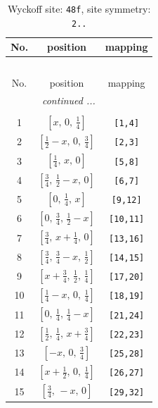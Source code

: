 \documentclass[fleqn,8pt]{jsarticle}
\begin{document}
\renewcommand{\arraystretch}{1.2}
\begin{longtable}{ccc}
\caption{Wyckoff site: {\tt 48f}, site symmetry: {\tt 2..}}
 \\
 \hline \hline
No. & position & mapping \\ \hline \endfirsthead

\multicolumn{2}{l}{\tablename\ \thetable{}} \\
 \hline \hline
No. & position & mapping \\ \hline \endhead

 \hline \hline
\multicolumn{2}{r}{\footnotesize\it continued ...} \\ \endfoot

 \hline \hline
\multicolumn{2}{r}{} \\ \endlastfoot

1 & $\left[ x,\, 0,\, \frac{1}{4} \right]$ & {\tt [1,4]} \\ \hline
2 & $\left[ \frac{1}{2} - x,\, 0,\, \frac{3}{4} \right]$ & {\tt [2,3]} \\ \hline
3 & $\left[ \frac{1}{4},\, x,\, 0 \right]$ & {\tt [5,8]} \\ \hline
4 & $\left[ \frac{3}{4},\, \frac{1}{2} - x,\, 0 \right]$ & {\tt [6,7]} \\ \hline
5 & $\left[ 0,\, \frac{1}{4},\, x \right]$ & {\tt [9,12]} \\ \hline
6 & $\left[ 0,\, \frac{3}{4},\, \frac{1}{2} - x \right]$ & {\tt [10,11]} \\ \hline
7 & $\left[ \frac{3}{4},\, x + \frac{1}{4},\, 0 \right]$ & {\tt [13,16]} \\ \hline
8 & $\left[ \frac{3}{4},\, \frac{3}{4} - x,\, \frac{1}{2} \right]$ & {\tt [14,15]} \\ \hline
9 & $\left[ x + \frac{3}{4},\, \frac{1}{2},\, \frac{1}{4} \right]$ & {\tt [17,20]} \\ \hline
10 & $\left[ \frac{1}{4} - x,\, 0,\, \frac{1}{4} \right]$ & {\tt [18,19]} \\ \hline
11 & $\left[ 0,\, \frac{1}{4},\, \frac{1}{4} - x \right]$ & {\tt [21,24]} \\ \hline
12 & $\left[ \frac{1}{2},\, \frac{1}{4},\, x + \frac{3}{4} \right]$ & {\tt [22,23]} \\ \hline
13 & $\left[ - x,\, 0,\, \frac{3}{4} \right]$ & {\tt [25,28]} \\ \hline
14 & $\left[ x + \frac{1}{2},\, 0,\, \frac{1}{4} \right]$ & {\tt [26,27]} \\ \hline
15 & $\left[ \frac{3}{4},\, - x,\, 0 \right]$ & {\tt [29,32]} \\ \hline

\end{longtable}
\end{document}
